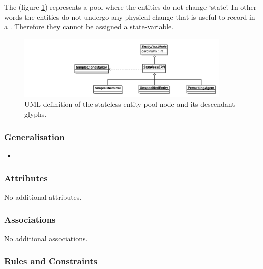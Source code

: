 \label{defn:StatelessEPN}

The  (figure \ref{fig:techref:statelessepnuml})
represents a pool where the entities do not change `state'. In
other-words the entities do not undergo any physical change that is
useful to record in a \PDm. Therefore they cannot be assigned
a state-variable.

\begin{figure}[htb]
  \centering
  \includegraphics[width=0.9\textwidth]{images/statelessepnuml}
  \caption{UML definition of the stateless entity pool node and its
    descendant glyphs.}
  \label{fig:techref:statelessepnuml}
\end{figure}

\subsubsection{Generalisation}

\begin{itemize}
\item {}
\end{itemize}

\subsubsection{Attributes}

No additional attributes.

\subsubsection{Associations}

No additional associations.

\subsubsection{Rules and Constraints}

\begin{valrules}
\end{valrules}

